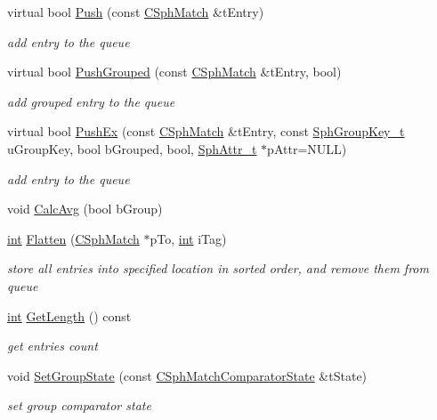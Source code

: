 \begin{DoxyCompactItemize}
virtual bool \hyperlink{classCSphKBufferGroupSorter_a86d29bcec77a75f5894a633fb22082ae}{Push} (const \hyperlink{classCSphMatch}{C\-Sph\-Match} \&t\-Entry)
\begin{DoxyCompactList}\small\item\em add entry to the queue \end{DoxyCompactList}\item 
virtual bool \hyperlink{classCSphKBufferGroupSorter_a3a0ed37c3dd9c06fc2524df71a9d45d1}{Push\-Grouped} (const \hyperlink{classCSphMatch}{C\-Sph\-Match} \&t\-Entry, bool)
\begin{DoxyCompactList}\small\item\em add grouped entry to the queue \end{DoxyCompactList}\item 
virtual bool \hyperlink{classCSphKBufferGroupSorter_a22dda19942d7a574fe70cc68e1f1c651}{Push\-Ex} (const \hyperlink{classCSphMatch}{C\-Sph\-Match} \&t\-Entry, const \hyperlink{sphinxsort_8cpp_ab18dbc744a7e1518a776845191f194c8}{Sph\-Group\-Key\-\_\-t} u\-Group\-Key, bool b\-Grouped, bool, \hyperlink{sphinx_8h_a7c122d91b0b52a0214ba176636bb1561}{Sph\-Attr\-\_\-t} $\ast$p\-Attr=N\-U\-L\-L)
\begin{DoxyCompactList}\small\item\em add entry to the queue \end{DoxyCompactList}\item 
void \hyperlink{classCSphKBufferGroupSorter_a9b4723e4aa57685f478bf6b9bf665ed8}{Calc\-Avg} (bool b\-Group)
\item 
\hyperlink{sphinxexpr_8cpp_a4a26e8f9cb8b736e0c4cbf4d16de985e}{int} \hyperlink{classCSphKBufferGroupSorter_ace57d6fbeda20fd506a8bbff0b978c2a}{Flatten} (\hyperlink{classCSphMatch}{C\-Sph\-Match} $\ast$p\-To, \hyperlink{sphinxexpr_8cpp_a4a26e8f9cb8b736e0c4cbf4d16de985e}{int} i\-Tag)
\begin{DoxyCompactList}\small\item\em store all entries into specified location in sorted order, and remove them from queue \end{DoxyCompactList}\item 
\hyperlink{sphinxexpr_8cpp_a4a26e8f9cb8b736e0c4cbf4d16de985e}{int} \hyperlink{classCSphKBufferGroupSorter_adf17b66728bef959d0cc6412cfe3f558}{Get\-Length} () const 
\begin{DoxyCompactList}\small\item\em get entries count \end{DoxyCompactList}\item 
void \hyperlink{classCSphKBufferGroupSorter_ae330f8013ad2179b0b6bd24817dafb7d}{Set\-Group\-State} (const \hyperlink{structCSphMatchComparatorState}{C\-Sph\-Match\-Comparator\-State} \&t\-State)
\begin{DoxyCompactList}\small\item\em set group comparator state \end{DoxyCompactList}\end{DoxyCompactItemize}
